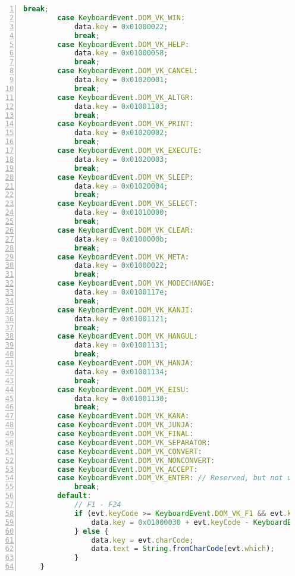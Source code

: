 \begin{lstlisting}[language=JavaScript,numbers=left,caption={Fragment metody translacji kodów klawiatury},label={lst:addons_keyboard_method}]
            break;
        case KeyboardEvent.DOM_VK_WIN:
            data.key = 0x01000022;
            break;
        case KeyboardEvent.DOM_VK_HELP:
            data.key = 0x01000058;
            break;
        case KeyboardEvent.DOM_VK_CANCEL:
            data.key = 0x01020001;
            break;
        case KeyboardEvent.DOM_VK_ALTGR:
            data.key = 0x01001103;
            break;
        case KeyboardEvent.DOM_VK_PRINT:
            data.key = 0x01020002;
            break;
        case KeyboardEvent.DOM_VK_EXECUTE:
            data.key = 0x01020003;
            break;
        case KeyboardEvent.DOM_VK_SLEEP:
            data.key = 0x01020004;
            break;
        case KeyboardEvent.DOM_VK_SELECT:
            data.key = 0x01010000;
            break;
        case KeyboardEvent.DOM_VK_CLEAR:
            data.key = 0x0100000b;
            break;
        case KeyboardEvent.DOM_VK_META:
            data.key = 0x01000022;
            break;
        case KeyboardEvent.DOM_VK_MODECHANGE:
            data.key = 0x0100117e;
            break;
        case KeyboardEvent.DOM_VK_KANJI:
            data.key = 0x01001121;
            break;
        case KeyboardEvent.DOM_VK_HANGUL:
            data.key = 0x01001131;
            break;
        case KeyboardEvent.DOM_VK_HANJA:
            data.key = 0x01001134;
            break;
        case KeyboardEvent.DOM_VK_EISU:
            data.key = 0x01001130;
            break;
        case KeyboardEvent.DOM_VK_KANA:
        case KeyboardEvent.DOM_VK_JUNJA:
        case KeyboardEvent.DOM_VK_FINAL:
        case KeyboardEvent.DOM_VK_SEPARATOR:
        case KeyboardEvent.DOM_VK_CONVERT:
        case KeyboardEvent.DOM_VK_NONCONVERT:
        case KeyboardEvent.DOM_VK_ACCEPT:
        case KeyboardEvent.DOM_VK_ENTER: // Reserved, but not used.
            break;
        default:
            // F1 - F24
            if (evt.keyCode >= KeyboardEvent.DOM_VK_F1 && evt.keyCode <= KeyboardEvent.DOM_VK_F24) {
                data.key = 0x01000030 + evt.keyCode - KeyboardEvent.DOM_VK_F1;
            } else {
                data.key = evt.charCode;
                data.text = String.fromCharCode(evt.which);
            }
    }
\end{lstlisting}
